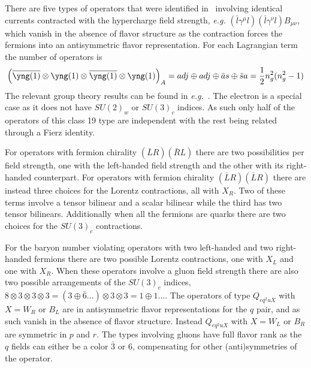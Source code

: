 \begin{enumerate}
There are five types of operators that were identified in~\cite{Henning:2015alf} involving identical currents contracted with the hypercharge field strength, \textit{e.g.} $(\bar l \gamma^\mu l) (\bar l \gamma^\nu l) B_{\mu\nu}$, which vanish in the absence of flavor structure as the contraction forces the fermions into an antisymmetric flavor representation.
For each Lagrangian term the number of operators is
\begin{equation}
\label{eq:4f}
\left(\overline{\yng(1)} \otimes \yng(1) \otimes \overline{\yng(1)} \otimes \yng(1)\right)_A = adj \oplus adj \oplus \bar a s \oplus \bar s a = \frac{1}{2} n_g^2 (n_g^2 - 1)
\end{equation}
The relevant group theory results can be found in \textit{e.g.}~\cite{Dashen:1994qi}.
The electron is a special case as it does not have $SU(2)_w$ or $SU(3)_c$ indices.
As such only half of the operators of this class 19 type are independent with the rest being related through a Fierz identity.

For operators with fermion chirality $(\bar L R) (\bar R L)$ there are two possibilities per field strength, one with the left-handed field strength and the other with its right-handed counterpart.
For operators with fermion chirality $(\bar L R) (\bar L R)$ there are instead three choices for the Lorentz contractions, all with $X_R$.
Two of these terms involve a tensor bilinear and a scalar bilinear while the third has two tensor bilinears.
Additionally when all the fermions are quarks there are two choices for the $SU(3)_c$ contractions.

For the baryon number violating operators with two left-handed and two right-handed fermions there are two possible Lorentz contractions, one with $X_L$ and one with $X_R$.
When these operators involve a gluon field strength there are also two possible arrangements of the $SU(3)_c$ indices, $8 \otimes 3 \otimes 3 \otimes 3 = (3 \oplus \bar 6 \ldots) \otimes 3 \otimes 3 = 1 \oplus 1 \ldots$.
The operators of type $Q_{eq^2uX}$ with $X = W_R$ or $B_L$ are in antisymmetric flavor representations for the $q$ pair, and as such vanish in the absence of flavor structure.
Instead $Q_{eq^2uX}$ with $X = W_L$ or $B_R$ are symmetric in $p$ and $r$.
The types involving gluons have full flavor rank as the $q$ fields can either be a color $\bar 3$ or $6$, compensating for other (anti)symmetries of the operator.


\end{enumerate}
